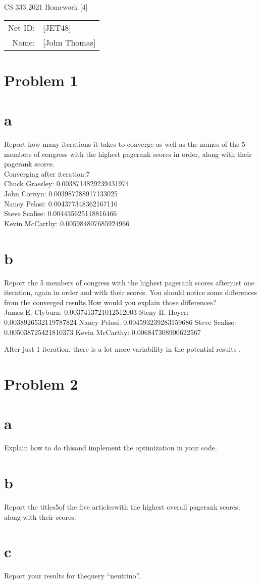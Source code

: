 \documentclass[12pt]{article}
\begin{document}
\begin{center}
{\Large CS 333 2021 Homework [4]}

\begin{tabular}{rl}
Net ID: & [JET48] \\
Name: & [John Thomas] \\
\end{tabular}
\end{center}

\section*{Problem 1 }
\section*{a}  
Report how many iterations it takes to converge as well as the names of the 5 members of congress with the highest pagerank scores in order, along with their pagerank scores. \\
Converging after iteration:7 \\
Chuck Grassley: 0.0038714829239431974 \\
John Cornyn: 0.003987288917133025 \\
Nancy Pelosi: 0.004377348362167116 \\
Steve Scalise: 0.004435625118816466 \\
Kevin McCarthy: 0.005984807685924966 \\

\section*{b} 
Report the 5 members of congress with the highest pagerank scores afterjust one iteration, again in order and with their scores. You should notice some differences from the converged results.How would you explain those differences? \\
James E. Clyburn: 0.0037413721012512003
Steny H. Hoyer: 0.0038926532119787824
Nancy Pelosi: 0.004593239283159686
Steve Scalise: 0.005038725421810373
Kevin McCarthy: 0.006847308900622567

After just 1 iteration, there is a lot more variability in the potential results . 

\section*{Problem 2}

\section*{a} 
Explain how to do thisand implement the optimization in your code.

\section*{b} 
Report the titles5of the five articleswith the highest overall pagerank scores, along with their scores.

 
\section*{c} 
Report your results for thequery “neutrino”.
\end{document}

